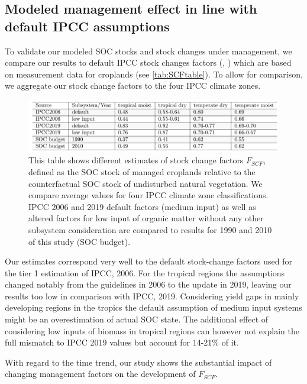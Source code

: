 \documentclass[gc, manuscript]{copernicus}
\begin{document}
\hypertarget{modeled-management-effect-in-line-with-default-ipcc-assumptions}{%
\subsection{Modeled management effect in line with default IPCC assumptions}\label{modeled-management-effect-in-line-with-default-ipcc-assumptions}}

To validate our modeled SOC stocks and stock changes under management, we compare our results to default IPCC stock changes factors (\citet{ipcc_2006_2006}, \citet{ipcc_2019_2019}) which are based on measurement data for croplands (see \ref{tab:SCFtable}). To allow for comparison, we aggregate our stock change factors to the four IPCC climate zones.

\begin{figure}
\includegraphics[width=16cm]{../ResultNotebooks/Output/Images/TableSCF_comparison} \caption{This table shows different estimates of stock change factors $F_{SCF}$, defined as the SOC stock of managed croplands relative to the counterfactual SOC stock of undisturbed natural vegetation. We compare average values for four IPCC climate zone classifications. IPCC 2006 and 2019 default factors (medium input) as well as altered factors for low input of organic matter without any other subsystem consideration are compared to results for 1990 and 2010 of this study (SOC budget).}\label{fig:SCFtable}
\end{figure}

Our estimates correspond very well to the default stock-change factors used for the tier 1 estimation of IPCC, 2006. For the tropical regions the assumptions changed notably from the guidelines in 2006 to the update in 2019, leaving our results too low in comparison with IPCC, 2019. Considering yield gaps in mainly developing regions in the tropics the default assumption of medium input systems might be an overestimation of actual SOC state. The additional effect of considering low inputs of biomass in tropical regions can however not explain the full mismatch to IPCC 2019 values but account for 14-21\% of it.

With regard to the time trend, our study shows the substantial impact of changing management factors on the development of \(F_{SCF}\).
\end{document}
